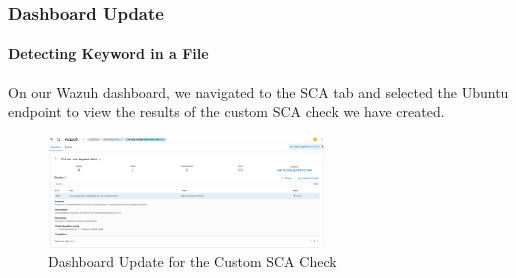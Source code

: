 \subsubsection{Dashboard Update}
\paragraph{Detecting Keyword in a File}
On our Wazuh dashboard, we navigated to the SCA tab and selected the Ubuntu endpoint to view the results of the custom SCA check we have created.
\begin{figure} [H]
    \centering
    \includegraphics[width=0.65\textwidth]{images/sca/sca-5.png}
    \caption{Dashboard Update for the Custom SCA Check}
    \label{fig:sca-5}
\end{figure}


